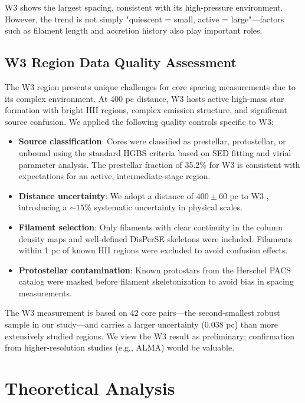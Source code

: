 \documentclass[11pt,a4paper]{article}
\begin{document}
W3 shows the largest spacing, consistent with its high-pressure environment. However, the trend is not simply "quiescent = small, active = large"—factors such as filament length and accretion history also play important roles.

\subsection{W3 Region Data Quality Assessment}
\label{sec:w3_details}

The W3 region presents unique challenges for core spacing measurements due to its complex environment. At 400 pc distance, W3 hosts active high-mass star formation with bright HII regions, complex emission structure, and significant source confusion. We applied the following quality controls specific to W3:

\begin{itemize}
    \item \textbf{Source classification}: Cores were classified as prestellar, protostellar, or unbound using the standard HGBS criteria based on SED fitting and virial parameter analysis. The prestellar fraction of 35.2\% for W3 is consistent with expectations for an active, intermediate-stage region.
    \item \textbf{Distance uncertainty}: We adopt a distance of $400 \pm 60$ pc to W3 \citep{Xu2021}, introducing a $\sim15\%$ systematic uncertainty in physical scales.
    \item \textbf{Filament selection}: Only filaments with clear continuity in the column density maps and well-defined DisPerSE skeletons were included. Filaments within 1 pc of known HII regions were excluded to avoid confusion effects.
    \item \textbf{Protostellar contamination}: Known protostars from the Herschel PACS catalog \citep{Joswig2013} were masked before filament skeletonization to avoid bias in spacing measurements.
\end{itemize}

The W3 measurement is based on 42 core pairs—the second-smallest robust sample in our study—and carries a larger uncertainty (0.038 pc) than more extensively studied regions. We view the W3 result as preliminary; confirmation from higher-resolution studies (e.g., ALMA) would be valuable.

\section{Theoretical Analysis}
\end{document}
